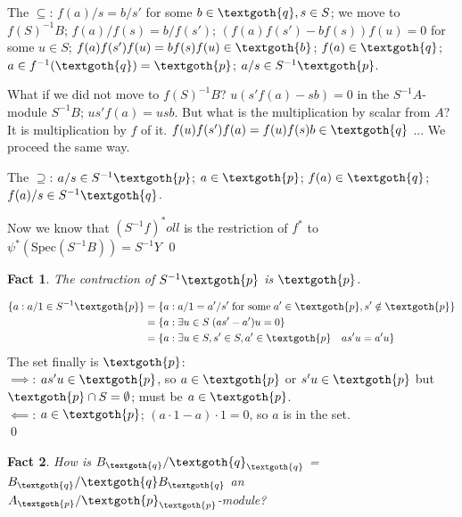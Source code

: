 \documentclass{article}
\newtheorem{theorem}{Fact}[section]
\begin{document}
The $\subseteq$: $f(a)/s = b/s'$ for some $b \in \textgoth{q}, s \in S$; we move to $f(S)^{-1}B$; $f(a)/f(s) = b/f(s')$; $(f(a)f(s') - bf(s))f(u) = 0$ for some $u \in S$; $f(a)f(s')f(u) = bf(s)f(u) \in \textgoth{b}$; $f(a) \in \textgoth{q}$; $a \in f^{-1}(\textgoth{q}) = \textgoth{p}$; $a/s \in S^{-1}\textgoth{p}$. 

What if we did not move to $f(S)^{-1}B$? $u(s'f(a) - sb) = 0$ in the $S^{-1}A$-module $S^{-1}B$; $us'f(a) = usb$. But what is the multiplication by scalar from $A$? It is multiplication by $f$ of it. $f(u)f(s')f(a) = f(u)f(s)b \in \textgoth{q}$ ... We proceed the same way.

The $\supseteq$: $a/s \in S^{-1}\textgoth{p}$; $a \in \textgoth{p}$; $f(a) \in \textgoth{q}$; $f(a)/s \in S^{-1}\textgoth{q}$.

Now we know that $(S^{-1}f)^*oll$ is the restriction of $f^*$ to $\psi^*(\textrm{Spec}(S^{-1}B)) = S^{-1}Y$
\qed

\bigskip
\begin{theorem}
The contraction of $S^{-1}\textgoth{p}$ is $\textgoth{p}$.
\end{theorem}

\noindent
\begin{equation*}
\begin{split}
\{a: a/1 \in S^{-1}\textgoth{p}\} & = \{ a: a/1 = a'/s' \; \text{for some} \; a' \in \textgoth{p}, s' \notin \textgoth{p} \} \\
& = \{a: \exists u \in S \; (as' - a')u = 0 \} \\
& = \{a: \exists u \in S, s' \in S, a' \in \textgoth{p} \quad as'u = a'u  \}
\end{split}
\end{equation*}
The set finally is $\textgoth{p}$: \\
$\implies$: $as'u \in \textgoth{p}$, so $a \in \textgoth{p}$ or $s'u \in \textgoth{p}$ but $\textgoth{p} \cap S = \emptyset$; must be $a \in \textgoth{p}$. \\
$\impliedby$: $a \in \textgoth{p}$; $(a \cdot 1 - a)\cdot 1 = 0$, so $a$ is in the set. \\
\qed

\bigskip
\begin{theorem}
How is $B_\textgoth{q} / \textgoth{q}_\textgoth{q}$ = $B_\textgoth{q}/\textgoth{q}B_\textgoth{q}$ an $A_\textgoth{p} / \textgoth{p}_\textgoth{p}$-module?
\end{theorem}
\end{document}
